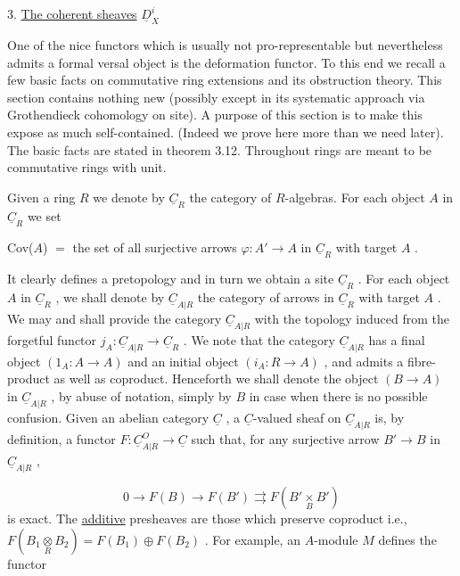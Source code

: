 3.  \underline{The coherent sheaves}  $\underline{D}^i_X$

One of the nice functors which is usually not pro-representable but nevertheless admits a formal versal object is the deformation functor. To this end we recall a few basic facts on commutative ring extensions and its obstruction theory. This section contains nothing new (possibly except in its systematic approach via Grothendieck cohomology on site). A purpose of this section is to make this expose as much self-contained. (Indeed we prove here more than we need later). The basic facts are stated in theorem 3.12. Throughout rings are meant to be commutative rings with unit.



Given a ring  $R$  we denote by  $\underline{C}_R$  the category of $R$-algebras. For each object  $A$  in  $\underline{C}_R$  we set

Cov($A$) $=$ the set of all surjective arrows  $\varphi : A' \to A$  in  $\underline{C}_R$  with target  $A$ .

It clearly defines a pretopology and in turn we obtain a site  $\underline{C}_R$ . For each object  $A$  in  $\underline{C}_R$ , we shall denote by  $\underline{C}_{A|R}$  the category of arrows in  $\underline{C}_R$  with target  $A$ . We may and shall provide the category  $\underline{C}_{A|R}$  with the topology induced from the forgetful functor  $j_A : \underline{C}_{A|R} \to \underline{C}_R$ . We note that the category  $\underline{C}_{A|R}$  has a final object  $(1_A : A \to A)$  and an initial object  $(i_A : R \to A)$ , and admits a fibre-product as well as coproduct. Henceforth we shall denote the object  $(B \to A)$  in  $\underline{C}_{A|R}$ , by abuse of notation, simply by  $B$  in case when there is no possible confusion. Given an abelian category  $\underline{C}$ , a  $\underline{C}$-valued sheaf on  $\underline{C}_{A|R}$  is, by definition, a functor  $F : \underline{C}^{O}_{A|R} \to \underline{C}$  such that, for any surjective arrow  $B' \to B$  in  $\underline{C}_{A|R}$ ,

\begin{equation*}
0 \to F(B) \to F(B') \rightrightarrows F(B' \underset{B}{\times} B')
\end{equation*}
is exact. The  \underline{additive}  presheaves are those which preserve coproduct i.e.,  $F(B_1 \underset{R}{\otimes} B_2) = F(B_1) \oplus F(B_2)$ . For example, an $A$-module  $M$  defines the functor


